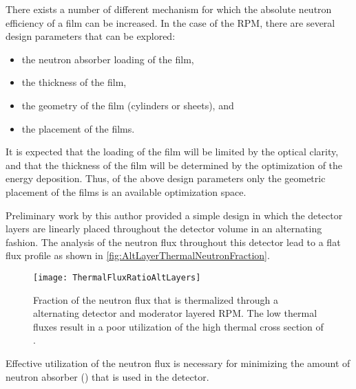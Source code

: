 There exists a number of different mechanism for which the absolute neutron efficiency of a film can be increased.
In the case of the RPM, there are several design parameters that can be explored:
\begin{itemize}
  \item the neutron absorber loading of the film,
  \item the thickness of the film,
  \item the geometry of the film (cylinders or sheets), and
  \item the placement of the films.
\end{itemize}
It is expected that the loading of the film will be limited by the optical clarity, and that the thickness of the film will be determined by the optimization of the energy deposition.
Thus, of the above design parameters only the geometric placement of the films is an available optimization space.

Preliminary work by this author provided a simple design in which the detector layers are linearly placed throughout the detector volume in an alternating fashion.
The analysis of the neutron flux throughout this detector lead to a flat flux profile as shown in \autoref{fig:AltLayerThermalNeutronFraction}.
\begin{figure}
  \texttt{[image: ThermalFluxRatioAltLayers]}
	\caption[Fraction of Neutron Flux in Alternating Layered Detectors]{Fraction of the neutron flux that is thermalized through a alternating detector and moderator layered RPM.  The low thermal fluxes result in a poor utilization of the high thermal cross section of .}
	\label{fig:AltLayerThermalNeutronFraction}
\end{figure}
Effective utilization of the neutron flux is necessary for minimizing the amount of neutron absorber () that is used in the detector.

